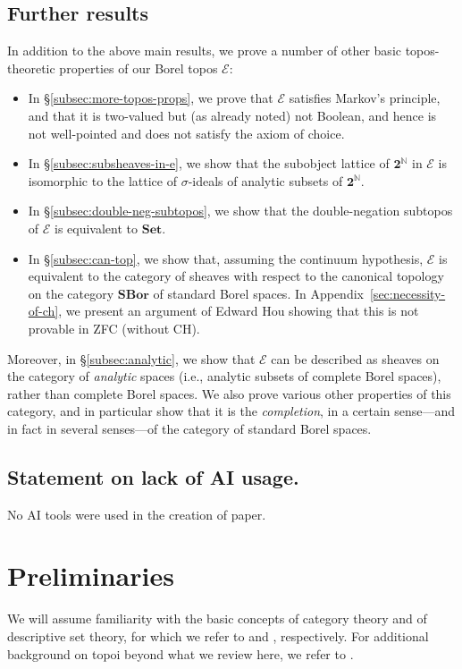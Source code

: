 \documentclass[11pt]{amsart}
\newcommand\cE{\mathcal{E}}
\newcommand{\N}{\mathbb{N}}
\newcommand\SBor{\mathbf{SBor}}
\newcommand\Set{\mathbf{Set}}
\newcommand\two{\mathbf{2}}
\theoremstyle{definition}
\theoremstyle{remark}
\theoremstyle{plain}
\begin{document}
\subsection{Further results}
In addition to the above main results, we prove a number of other basic topos-theoretic properties of our Borel topos \( \cE \):
\begin{itemize}
\item In \S\ref{subsec:more-topos-props}, we prove that \( \cE \) satisfies Markov's principle, and that it is two-valued but (as already noted) not Boolean, and hence is not well-pointed and does not satisfy the axiom of choice.
\item In \S\ref{subsec:subsheaves-in-e}, we show that the subobject lattice of \( \two^\N \) in \( \cE \) is isomorphic to the lattice of \( \sigma \)-ideals of analytic subsets of \( \two^\N \).
\item In \S\ref{subsec:double-neg-subtopos}, we show that the double-negation subtopos of \( \cE \) is equivalent to \( \Set \).
\item In \S\ref{subsec:can-top}, we show that, assuming the continuum hypothesis, \( \cE \) is equivalent to the category of sheaves with respect to the canonical topology on the category \( \SBor \) of standard Borel spaces.
In Appendix~\ref{sec:necessity-of-ch}, we present an argument of Edward Hou showing that this is not provable in ZFC (without CH).
\end{itemize}

Moreover, in \S\ref{subsec:analytic}, we show that \( \cE \) can be described as sheaves on the category of \emph{analytic} spaces (i.e., analytic subsets of complete Borel spaces), rather than complete Borel spaces.
We also prove various other properties of this category, and in particular show that it is the \emph{completion}, in a certain sense---and in fact in several senses---of the category of standard Borel spaces.

\subsection{Statement on lack of AI usage.}
No AI tools were used in the creation of paper.

\section{Preliminaries}
We will assume familiarity with the basic concepts of category theory and of descriptive set theory, for which we refer to \cite{maclane-categories} and \cite{kechris-classical}, respectively.
For additional background on topoi beyond what we review here, we refer to \cite{johnstone-topos-theory,mac-lane-moerdijk,johnstone-elephant-vols}.
\end{document}
